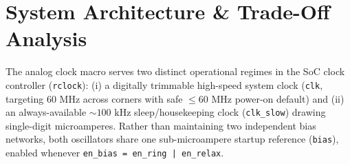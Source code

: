 \documentclass[10pt,a4paper]{article}
\begin{document}
\section{System Architecture \& Trade-Off Analysis}

The analog clock macro serves two distinct operational regimes in the SoC clock controller (\texttt{rclock}): (i) a digitally trimmable high-speed system clock (\texttt{clk}, targeting $60\text{ MHz}$ across corners with safe $\le 60\text{ MHz}$ power-on default) and (ii) an always-available $\sim 100\text{ kHz}$ sleep/housekeeping clock (\texttt{clk\_slow}) drawing single-digit microamperes. Rather than maintaining two independent bias networks, both oscillators share one sub-microampere startup reference (\texttt{bias}), enabled whenever \texttt{en\_bias = en\_ring | en\_relax}.
\end{document}
